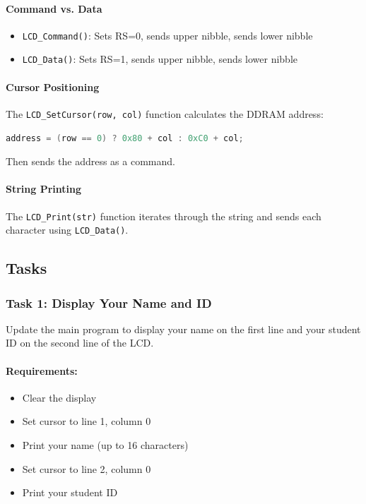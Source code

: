 \paragraph{Command vs. Data}
\begin{itemize}[nosep]
  \item \texttt{LCD\_Command()}: Sets RS=0, sends upper nibble, sends lower nibble
  \item \texttt{LCD\_Data()}: Sets RS=1, sends upper nibble, sends lower nibble
\end{itemize}

\paragraph{Cursor Positioning}
The \texttt{LCD\_SetCursor(row, col)} function calculates the DDRAM address:
\begin{lstlisting}[language=C]
address = (row == 0) ? 0x80 + col : 0xC0 + col;
\end{lstlisting}
\noindent
Then sends the address as a command.

\paragraph{String Printing}
The \texttt{LCD\_Print(str)} function iterates through the string and sends each character using \texttt{LCD\_Data()}.

\newpage
\subsection{Tasks}

\subsubsection{Task 1: Display Your Name and ID}

Update the main program to display your name on the first line and your student ID on the second line of the LCD.

\paragraph{Requirements:}
\begin{itemize}[nosep]
  \item Clear the display
  \item Set cursor to line 1, column 0
  \item Print your name (up to 16 characters)
  \item Set cursor to line 2, column 0
  \item Print your student ID
\end{itemize}

